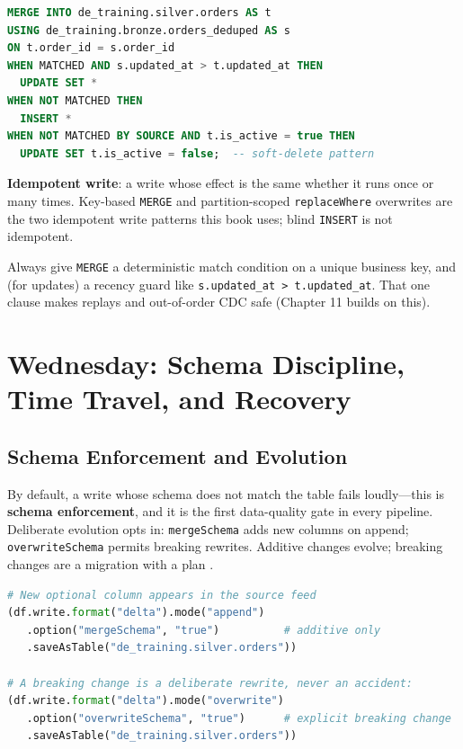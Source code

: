 \begin{lstlisting}[language=SQL,caption={The idempotent upsert pattern used across the book.},label={lst:ch2-merge}]
MERGE INTO de_training.silver.orders AS t
USING de_training.bronze.orders_deduped AS s
ON t.order_id = s.order_id
WHEN MATCHED AND s.updated_at > t.updated_at THEN
  UPDATE SET *
WHEN NOT MATCHED THEN
  INSERT *
WHEN NOT MATCHED BY SOURCE AND t.is_active = true THEN
  UPDATE SET t.is_active = false;  -- soft-delete pattern
\end{lstlisting}

\begin{definitionbox}
\textbf{Idempotent write}: a write whose effect is the same whether it runs once or many times. Key-based \texttt{MERGE} and partition-scoped \texttt{replaceWhere} overwrites are the two idempotent write patterns this book uses; blind \texttt{INSERT} is not idempotent.
\end{definitionbox}

\begin{tipbox}
Always give \texttt{MERGE} a deterministic match condition on a unique business key, and (for updates) a recency guard like \texttt{s.updated\_at > t.updated\_at}. That one clause makes replays and out-of-order CDC safe (Chapter 11 builds on this).
\end{tipbox}

\section{Wednesday: Schema Discipline, Time Travel, and Recovery}
\subsection{Schema Enforcement and Evolution}
By default, a write whose schema does not match the table fails loudly---this is \textbf{schema enforcement}, and it is the first data-quality gate in every pipeline. Deliberate evolution opts in: \texttt{mergeSchema} adds new columns on append; \texttt{overwriteSchema} permits breaking rewrites. Additive changes evolve; breaking changes are a migration with a plan \cite{deltaLakeDocs}.

\begin{lstlisting}[language=Python,caption={Deliberate, opt-in schema evolution.},label={lst:ch2-merge-schema}]
# New optional column appears in the source feed
(df.write.format("delta").mode("append")
   .option("mergeSchema", "true")          # additive only
   .saveAsTable("de_training.silver.orders"))

# A breaking change is a deliberate rewrite, never an accident:
(df.write.format("delta").mode("overwrite")
   .option("overwriteSchema", "true")      # explicit breaking change
   .saveAsTable("de_training.silver.orders"))
\end{lstlisting}

